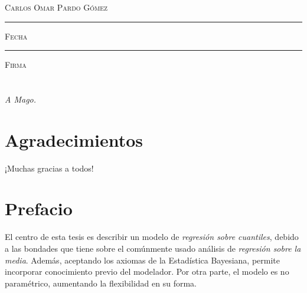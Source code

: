 \documentclass[letterpaper,onside,11pt,review]{report}
\begin{document}
\centering

\hspace{3em}

\textsc{Carlos Omar Pardo G\'omez}

\vspace{5em}

\rule[1em]{20em}{0.5pt} %

\textsc{Fecha}
 
\vspace{8em}

\rule[1em]{20em}{0.5pt} %

\textsc{Firma}

\endgroup
\vspace*{\fill}

\pagestyle{empty}
\frontmatter

\chapter*{}
\begin{flushright}
\textit{A Mago.}
\end{flushright}


\chapter*{Agradecimientos}
¡Muchas gracias a todos!


\pagestyle{plain}
\chapter*{Prefacio}


El centro de esta tesis es describir un modelo de \textit{regresi\'on sobre cuantiles}, debido a las bondades que tiene sobre el com\'unmente usado an\'alisis de \textit{regresi\'on sobre la media}. Adem\'as, aceptando los axiomas de la Estad\'istica Bayesiana, permite incorporar conocimiento previo del modelador. Por otra parte, el modelo es no param\'etrico, aumentando la flexibilidad en su forma.
\end{document}
